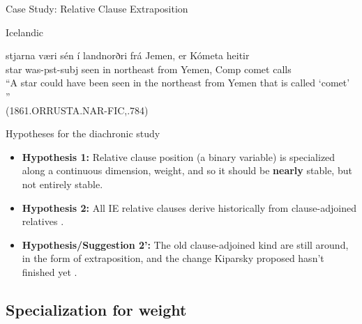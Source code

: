 \documentclass[hyperref={pdfpagelabels=false}]{beamer}
\begin{document}
\begin{frame}{Case Study: Relative Clause Extraposition}


\begin{block}{Icelandic}
		\begin{exe}
			\ex \gll stjarna væri sén í landnorðri frá Jemen, er Kómeta heitir\\
			star was-pst-subj seen in northeast from Yemen, Comp comet calls\\
			\quad ``A star could have been seen in the northeast from Yemen that is called `comet' ''\\
			(1861.ORRUSTA.NAR-FIC,.784)
		\end{exe}
	\end{block}

\end{frame}


\begin{frame}{Hypotheses for the diachronic study}
\begin{itemize}
    \item \textbf{Hypothesis 1:} Relative clause position (a binary variable) is specialized along a continuous dimension, weight, and so it should be \textbf{nearly} stable, but not entirely stable.
    \item \textbf{Hypothesis 2:} All IE relative clauses derive historically from clause-adjoined relatives \small{\citep{kiparsky1995}}.
        \item \textbf{Hypothesis/Suggestion 2':} The old clause-adjoined kind are still around, in the form of extraposition, and the change Kiparsky proposed hasn't finished yet \small{\citep{wallenbergunderrev}}.
    \end{itemize}

\end{frame}



\subsection{Specialization for weight}
\end{document}
